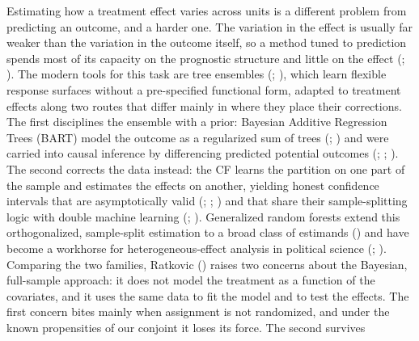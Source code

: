\documentclass[
  10pt,
  a4paper,
  DIV=11,
  numbers=noendperiod]{scrartcl}
\begin{document}
Estimating how a treatment effect varies across units is a different
problem from predicting an outcome, and a harder one. The variation in
the effect is usually far weaker than the variation in the outcome
itself, so a method tuned to prediction spends most of its capacity on
the prognostic structure and little on the effect
(;
). The
modern tools for this task are tree ensembles
(;
), which learn
flexible response surfaces without a pre-specified functional form,
adapted to treatment effects along two routes that differ mainly in
where they place their corrections. The first disciplines the ensemble
with a prior: Bayesian Additive Regression Trees (BART) model the
outcome as a regularized sum of trees
(;
) and were carried
into causal inference by differencing predicted potential outcomes
(;
;
). The second
corrects the data instead: the CF learns the partition on one part of
the sample and estimates the effects on another, yielding honest
confidence intervals that are asymptotically valid
(;
;
) and that
share their sample-splitting logic with double machine learning
(;
). Generalized random
forests extend this orthogonalized, sample-split estimation to a broad
class of estimands () and have become a workhorse for heterogeneous-effect analysis in
political science (;
). Comparing the
two families, Ratkovic ()
raises two concerns about the Bayesian, full-sample approach: it does
not model the treatment as a function of the covariates, and it uses the
same data to fit the model and to test the effects. The first concern
bites mainly when assignment is not randomized, and under the known
propensities of our conjoint it loses its force. The second survives
\end{document}
